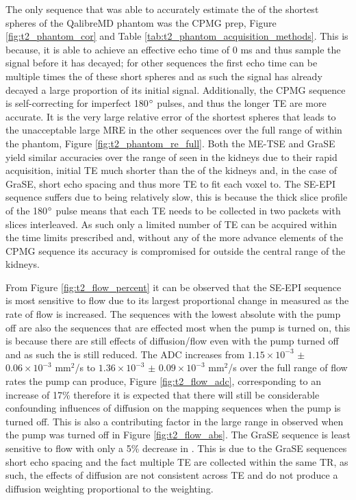 The only sequence that was able to accurately estimate the \ttwo of the shortest \ttwo spheres of the QalibreMD phantom was the \ac{CPMG} \ttwo prep, Figure \ref{fig:t2_phantom_cor} and Table \ref{tab:t2_phantom_acquisition_methods}. This is because, it is able to achieve an effective echo time of 0 ms and thus sample the signal before it has decayed; for other sequences the first echo time can be multiple times the \ttwo of these short spheres and as such the signal has already decayed a large proportion of its initial signal. Additionally, the \ac{CPMG} sequence is self-correcting for imperfect 180$\degree$ pulses, and thus the longer \ac{TE} are more accurate. It is the very large relative error of the shortest \ttwo spheres that leads to the unacceptable large \ac{MRE} in the other sequences over the full range of \ttwo within the phantom, Figure \ref{fig:t2_phantom_re_full}. Both the \ac{ME-TSE} and \ac{GraSE} yield similar accuracies over the range of \ttwo seen in the kidneys due to their rapid acquisition, initial \ac{TE} much shorter than the \ttwo of the kidneys and, in the case of \ac{GraSE}, short echo spacing  and thus more \ac{TE} to fit each voxel to. The \ac{SE}-\ac{EPI} sequence suffers due to being relatively slow, this is because the thick slice profile of the 180$\degree$ pulse means that each \ac{TE} needs to be collected in two packets with slices interleaved. As such only a limited number of \ac{TE} can be acquired within the time limits prescribed and, without any of the more advance elements of the \ac{CPMG} sequence its accuracy is compromised for \ttwo outside the central range of the kidneys. 

From Figure \ref{fig:t2_flow_percent} it can be observed that the \ac{SE}-\ac{EPI} sequence is most sensitive to flow due to its largest proportional change in measured \ttwo as the rate of flow is increased.  The sequences with the lowest absolute \ttwo with the pump off are also the sequences that are effected most when the pump is turned on, this is because there are still effects of diffusion/flow even with the pump turned off and as such the \ttwo is still reduced. The \ac{ADC} increases from $1.15\times 10^{-3}$ $\pm$ $0.06\times 10^{-3}$ mm$^2$/s to $1.36\times 10^{-3}$ $\pm$ $0.09\times 10^{-3}$ mm$^2$/s over the full range of flow rates the pump can produce, Figure \ref{fig:t2_flow_adc}, corresponding to an increase of 17\% therefore it is expected that there will still be considerable confounding influences of diffusion on the \ttwo mapping sequences when the pump is turned off. This is also a contributing factor in the large range in \ttwo observed when the pump was turned off in Figure \ref{fig:t2_flow_abs}. The \ac{GraSE} sequence is least sensitive to flow with only a 5\% decrease in \ttwo. This is due to the \ac{GraSE} sequences short echo spacing and the fact multiple \ac{TE} are collected within the same \ac{TR}, as such, the effects of diffusion are not consistent across \ac{TE} and do not produce a diffusion weighting proportional to the \ttwo weighting.

